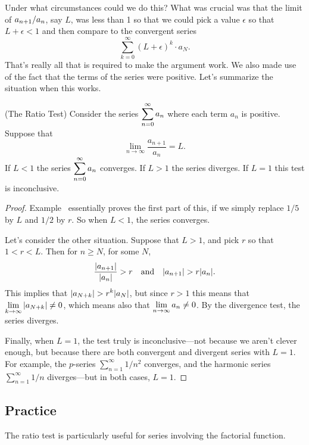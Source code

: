 Under what circumstances could we do this? What was crucial was that
the limit of $\displaystyle a_{n+1}/a_n$, say $L$, was less than 1 so that we
could pick a value $\epsilon$ so that $L + \epsilon < 1$ and then
compare to the convergent series
$$
\sum_{k=0}^\infty (L + \epsilon)^k \cdot a_N.
$$
That's really all that is required to make the argument work. We also
made use of the fact that the terms of the series were positive.
  Let's summarize the
situation when this works.

\begin{theorem} (The Ratio Test)
Consider the series $\displaystyle\sum_{n=0}^\infty a_n$ where each term $a_n$ is positive.
Suppose that
$$
\lim_{n\to \infty} \frac{a_{n+1}}{a_n}=L.
$$
If $L<1$ the series $\displaystyle\sum_{n=0}^\infty a_n$ converges.  If $L>1$ the
series diverges.  If $L=1$ this test is inconclusive.
\end{theorem}

\begin{proof}
  Example~ essentially proves
  the first part of this, if we simply replace $1/5$ by $L$ and $1/2$
  by $r$.  So when $L< 1$, the series converges.

Let's consider the other situation.  Suppose that $L>1$, and pick $r$
so that $1<r<L$.  Then for $n\ge N$, for some $N$,
$${|a_{n+1}|\over |a_n|} > r \hbox{\quad and\quad} |a_{n+1}| > r|a_n|.$$
This implies that $\ds |a_{N+k}|>r^k|a_N|$, but since $r>1$ this means
that $\displaystyle\lim_{k\to\infty}|a_{N+k}| \neq 0$, which means also that
$\displaystyle\lim_{n\to\infty}a_n \neq 0$. By the divergence test, the series
diverges.

Finally, when $L = 1$, the test truly is inconclusive---not because we
aren't clever enough, but because there are both convergent and
divergent series with $L = 1$.  For example, the $p$-series
$\sum_{n=1}^\infty 1/n^2$ converges, and the harmonic series
$\sum_{n=1}^\infty 1/n$ diverges---but in both cases, $L = 1$.
\end{proof}

\subsection{Practice}

The ratio test is particularly useful for series involving
the factorial function.


